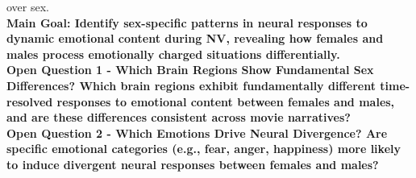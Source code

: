 \documentclass[11pt,a4paper]{article}
\begin{document}
over sex.\\
\textbf{Main Goal: Identify sex-specific patterns in neural responses to dynamic emotional content during NV,
revealing how females and males process emotionally charged situations differentially.}\\
\textbf{Open Question 1 - Which Brain Regions Show Fundamental Sex Differences? Which brain regions
exhibit fundamentally different time-resolved responses to emotional content between females and males,
and are these differences consistent across movie narratives?}\\
\textbf{Open Question 2 - Which Emotions Drive Neural Divergence? Are specific emotional categories (e.g.,
fear, anger, happiness) more likely to induce divergent neural responses between females and males?}\\




\printbibliography
\end{document}
